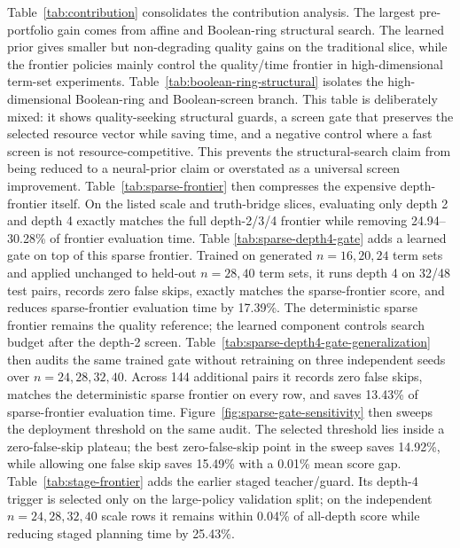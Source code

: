 \documentclass[11pt]{article}
\begin{document}
Table~\ref{tab:contribution} consolidates the contribution analysis.  The
largest pre-portfolio gain comes from affine and Boolean-ring structural
search.  The learned prior gives smaller but non-degrading quality gains on the
traditional slice, while the frontier policies mainly control the
quality/time frontier in high-dimensional term-set experiments.
Table~\ref{tab:boolean-ring-structural} isolates the high-dimensional
Boolean-ring and Boolean-screen branch.  This table is deliberately mixed: it
shows quality-seeking structural guards, a screen gate that preserves the
selected resource vector while saving time, and a negative control where a fast
screen is not resource-competitive.  This prevents the structural-search claim
from being reduced to a neural-prior claim or overstated as a universal screen
improvement.  Table~\ref{tab:sparse-frontier} then compresses the expensive
depth-frontier itself.  On the listed scale and truth-bridge slices, evaluating
only depth 2 and depth 4 exactly matches the full depth-2/3/4 frontier while
removing 24.94--30.28\% of frontier evaluation time.  Table
\ref{tab:sparse-depth4-gate} adds a learned gate on top of this sparse
frontier.  Trained on generated $n=16,20,24$ term sets and applied unchanged to
held-out $n=28,40$ term sets, it runs depth 4 on 32/48 test pairs, records zero
false skips, exactly matches the sparse-frontier score, and reduces
sparse-frontier evaluation time by 17.39\%.  The deterministic sparse frontier
remains the quality reference; the learned component controls search budget
after the depth-2 screen.  Table~\ref{tab:sparse-depth4-gate-generalization}
then audits the same trained gate without retraining on three independent seeds
over $n=24,28,32,40$.  Across 144 additional pairs it records zero false skips,
matches the deterministic sparse frontier on every row, and saves 13.43\% of
sparse-frontier evaluation time.  Figure~\ref{fig:sparse-gate-sensitivity}
then sweeps the deployment threshold on the same audit.  The selected threshold
lies inside a zero-false-skip plateau; the best zero-false-skip point in the
sweep saves 14.92\%, while allowing one false skip saves 15.49\% with a 0.01\%
mean score gap.  Table~\ref{tab:stage-frontier} adds the
earlier staged teacher/guard.  Its depth-4 trigger is selected only on the
large-policy validation split; on the independent $n=24,28,32,40$ scale rows it
remains within 0.04\% of all-depth score while reducing staged planning time by
25.43\%.

\begin{table}[H]
\centering
\scriptsize
\caption{Matched contribution decomposition.  Negative mean score changes
favor the first method in each comparison.}
\label{tab:contribution}

\end{table}
\end{document}
